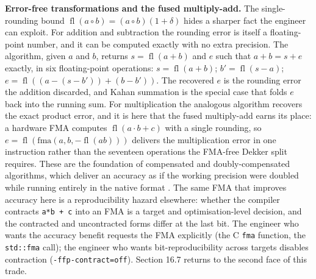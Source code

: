\begin{mastery}
\textbf{Error-free transformations and the fused multiply-add.} The
single-rounding bound $\operatorname{fl}(a \circ b) = (a \circ b)(1 +
\delta)$ hides a sharper fact the engineer can exploit. For addition and
subtraction the rounding error is itself a floating-point number, and it
can be computed exactly with no extra precision. The 
algorithm, given $a$ and $b$, returns $s = \operatorname{fl}(a + b)$ and
$e$ such that $a + b = s + e$ exactly, in six floating-point operations:
$s = \operatorname{fl}(a+b)$; $b' = \operatorname{fl}(s - a)$;
$e = \operatorname{fl}((a - (s - b')) + (b - b'))$. The recovered $e$ is
the rounding error the addition discarded, and Kahan summation is the
special case that folds $e$ back into the running sum. For multiplication
the analogous  algorithm recovers the exact product
error, and it is here that the fused multiply-add earns its place: a
hardware FMA computes $\operatorname{fl}(a \cdot b + c)$ with a single
rounding, so $e = \operatorname{fl}(\text{fma}(a, b, -\operatorname{fl}(a
b)))$ delivers the multiplication error in one instruction rather than the
seventeen operations the FMA-free Dekker split requires. These
 are the foundation of
compensated and doubly-compensated algorithms, which deliver an accuracy
as if the working precision were doubled while running entirely in the
native format \cite[ch.~4]{text:higham-numerical}. The same FMA that
improves accuracy here is a reproducibility hazard elsewhere: whether the
compiler contracts \texttt{a*b + c} into an FMA is a target and
optimisation-level decision, and the contracted and uncontracted forms
differ at the last bit. The engineer who wants the accuracy benefit
requests the FMA explicitly (the C \texttt{fma} function, the
\texttt{std::fma} call); the engineer who wants bit-reproducibility
across targets disables contraction (\texttt{-ffp-contract=off}). Section
16.7 returns to the second face of this trade.
\end{mastery}

